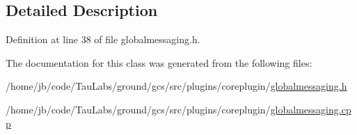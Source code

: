 \subsection{\-Detailed \-Description}


\-Definition at line 38 of file globalmessaging.\-h.



\-The documentation for this class was generated from the following files\-:\begin{DoxyCompactItemize}
\item 
/home/jb/code/\-Tau\-Labs/ground/gcs/src/plugins/coreplugin/\hyperlink{globalmessaging_8h}{globalmessaging.\-h}\item 
/home/jb/code/\-Tau\-Labs/ground/gcs/src/plugins/coreplugin/\hyperlink{globalmessaging_8cpp}{globalmessaging.\-cpp}\end{DoxyCompactItemize}
